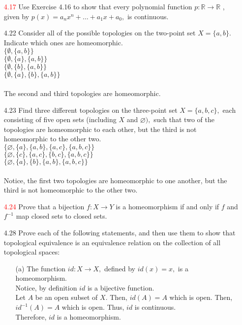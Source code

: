 \documentclass[12pt]{article}
\begin{document}
\begin{enumerate}
	\item[\textcolor{red}{4.17}] Use Exercise 4.16 to show that every polynomial function $p : \mathbb { R } \rightarrow \mathbb { R }$ , given by $p ( x ) = a _ { n } x ^ { n } + \ldots + a _ { 1 } x + a _ { 0 } ,$ is continuous.
	
	\item[4.22] Consider all of the possible topologies on the two-point set $X = \{ a , b \} .$ Indicate which ones are homeomorphic.\\
	$\{ \emptyset , \{ a , b \} \}$ \\
	$\{ \emptyset , \{ a \} , \{ a , b \} \}$\\
	$\{ \emptyset , \{ b \} , \{ a , b \} \}$\\
	$\{ \emptyset , \{ a \} , \{ b \} , \{ a , b \} \}$\\
	\\
	The second and third topologies are homeomorphic.
	
	\item[4.23] Find three different topologies on the three-point set $X = \{ a , b , c \} ,$ each consisting of five open sets (including $X$ and $\varnothing ) ,$ such that two of the topologies are homeomorphic to each other, but the third is not homeomorphic to the other two.\\
	$\{\varnothing, \{a\}, \{a,b\}, \{a,c\}, \{a,b,c\} \}$\\
	$\{\varnothing, \{c\}, \{a,c\}, \{b,c\}, \{a,b,c\} \}$\\
	$\{\varnothing, \{a\}, \{b\}, \{a,b\}, \{a,b,c\} \}$\\
	\\
	Notice, the first two topologies are homeomorphic to one another, but the third is not homeomorphic to the other two.
	\item[\textcolor{red}{4.24}] Prove that a bijection $f : X \rightarrow Y$ is a homeomorphism if and only if $f$ and $f ^ { - 1 }$ map closed sets to closed sets.
	
	\item[4.28] Prove each of the following statements, and then use them to show that topological equivalence is an equivalence relation on the collection of all topological spaces:
	\begin{enumerate}
		\item[(a)] The function $i d : X \rightarrow X ,$ defined by $i d ( x ) = x ,$ is a homeomorphism.\\
		Notice,  by definition $ id $ is a bijective function.  \\
		Let $ A $ be an open subset of $ X $. Then, $ id(A)=A $ which is open. Then, $ id^{-1}(A)=A $ which is open. Thus, $ id $ is continuous.\\
		Therefore, $ id $ is a homeomorphism.
		

\end{enumerate}
\end{enumerate}
\end{document}
